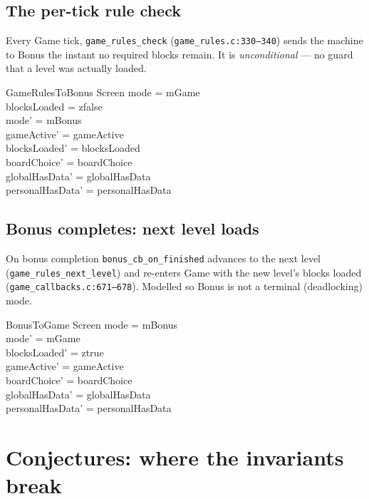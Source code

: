 \documentclass[a4paper,10pt,fleqn]{article}
\begin{document}
\subsection{The per-tick rule check}

Every \textsf{Game} tick, \texttt{game\_rules\_check}
(\texttt{game\_rules.c:330--340}) sends the machine to \textsf{Bonus}
the instant no required blocks remain.  It is \emph{unconditional} ---
no guard that a level was actually loaded.

\begin{schema}{GameRulesToBonus}
  \Delta Screen
  \where
  mode = mGame \\
  blocksLoaded = zfalse \\
  mode' = mBonus \\
  gameActive' = gameActive \\
  blocksLoaded' = blocksLoaded \\
  boardChoice' = boardChoice \\
  globalHasData' = globalHasData \\
  personalHasData' = personalHasData
\end{schema}

\subsection{Bonus completes: next level loads}

On bonus completion \texttt{bonus\_cb\_on\_finished} advances to the next
level (\texttt{game\_rules\_next\_level}) and re-enters \textsf{Game} with
the new level's blocks loaded (\texttt{game\_callbacks.c:671--678}).
Modelled so \textsf{Bonus} is not a terminal (deadlocking) mode.

\begin{schema}{BonusToGame}
  \Delta Screen
  \where
  mode = mBonus \\
  mode' = mGame \\
  blocksLoaded' = ztrue \\
  gameActive' = gameActive \\
  boardChoice' = boardChoice \\
  globalHasData' = globalHasData \\
  personalHasData' = personalHasData
\end{schema}

\section{Conjectures: where the invariants break}
\end{document}

